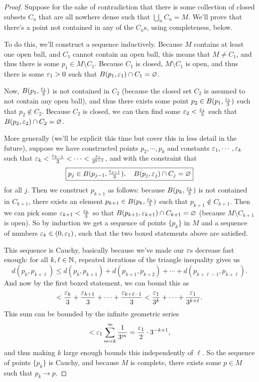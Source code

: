 \begin{proof}
Suppose for the sake of contradiction that there is some collection of closed subsets $C_n$ that are all nowhere dense such that $\bigcup_n C_n = M$. We'll prove that there's a point not contained in any of the $C_n$s, using completeness, below.

To do this, we'll construct a sequence inductively. Because $M$ contains at least one open ball, and $C_1$ cannot contain an open ball, this means that $M \ne C_1$, and thus there is some $p_1 \in M \setminus C_1$. Because $C_1$ is closed, $M \setminus C_1$ is open, and thus there is some $\varepsilon_1 > 0$ such that $B(p_1, \varepsilon_1) \cap C_1 = \varnothing$.

Now, $B(p_1, \frac{\varepsilon_1}{3})$ is not contained in $C_2$ (because the closed set $C_2$ is assumed to not contain any open ball), and thus there exists some point $p_2 \in B(p_1, \frac{\varepsilon_1}{3})$ such that $p_2 \not\in C_2$. Because $C_2$ is closed, we can then find some $\varepsilon_2 < \frac{\varepsilon_1}{3}$ such that $B(p_2, \varepsilon_2) \cap C_2 = \varnothing$.

More generally (we'll be explicit this time but cover this in less detail in the future), suppose we have constructed points $p_2, \cdots, p_k$ and constants $\varepsilon_1, \cdots, \varepsilon_k$ such that $\varepsilon_k < \frac{\varepsilon_{k-1}}{3} < \cdots < \frac{\varepsilon_1}{3^{k-1}}$, and with the constraint that 
\[
    \boxed{p_j \in B(p_{j-1}, \tfrac{\varepsilon_{j-1}}{3}), \quad B(p_j, \varepsilon_j) \cap C_j = \varnothing}
\]
for all $j$. Then we construct $p_{k+1}$ as follows: because $B(p_k, \frac{\varepsilon_k}{3})$ is not contained in $C_{k+1}$, there exists an element $p_{k+1} \in B(p_k, \frac{\varepsilon_k}{3})$ such that $p_{k+1} \not\in C_{k+1}$. Then we can pick some $\varepsilon_{k+1} < \frac{\varepsilon_k}{3}$ so that $B(p_{k+1}, \varepsilon_{k+1}) \cap C_{k+1} = \varnothing$ (because $M \setminus C_{k+1}$ is open). So by induction we get a sequence of points $\{p_k\}$ in $M$ and a sequence of numbers $\varepsilon_k \in (0, \varepsilon_1)$, such that the two boxed statements above are satisfied.

This sequence is Cauchy, basically because we've made our $\varepsilon$s decrease fast enough: for all $k, \ell \in \mathbb N$, repeated iterations of the triangle inequality gives us
\[
    d(p_k, p_{k+\ell}) \le d(p_k, p_{k+1}) + d(p_{k+1}, p_{k+2}) + \cdots + d(p_{k+\ell-1}, p_{k+\ell}).
\]
And now by the first boxed statement, we can bound this as 
\[
     < \frac{\varepsilon_k}{3} + \frac{\varepsilon_{k+1}}{3} + \cdots + \frac{\varepsilon_{k+\ell-1}}{3} < \frac{\varepsilon_1}{3^k} + \cdots + \frac{\varepsilon_1}{3^{k+\ell}}.
\]
This sum can be bounded by the infinite geometric series 
\[
    < \varepsilon_1 \sum_{m=k}^{\infty} \frac{1}{3^m} = \frac{\varepsilon_1}{2} \cdot 3^{-k+1},
\]
and thus making $k$ large enough bounds this independently of $\ell$. So the sequence of points $\{p_k\}$ is Cauchy, and because $M$ is complete, there exists some $p \in M$ such that $p_k \to p$.


\end{proof}
